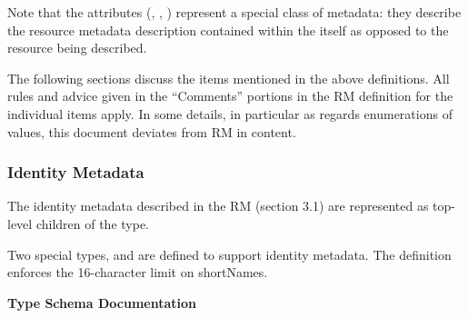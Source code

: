\documentclass[11pt,a4paper]{ivoa}
\begin{document}
\endgroup

Note that the  attributes (,
, ) represent a special class of
metadata: they describe the resource metadata description contained
within the  itself as opposed to the resource being
described. 

The following sections discuss the items mentioned in the above
definitions.
All rules and advice given in the ``Comments'' portions in
the RM definition for the individual items 
apply. In some details, in particular as regards enumerations of values,
this document deviates from RM in content.

\subsubsection{Identity Metadata}

The identity metadata described in the RM (section
3.1) are represented as top-level children of the
 type.

Two special types,  and
 are defined to support identity
metadata.  The  definition enforces the
16-character limit on shortNames.  

\begingroup
      	\renewcommand*\descriptionlabel[1]{%
      	\hbox to 5.5em{\emph{#1}\hfil}}\vspace{2ex}\noindent\textbf{ Type Schema Documentation}



\end{document}

